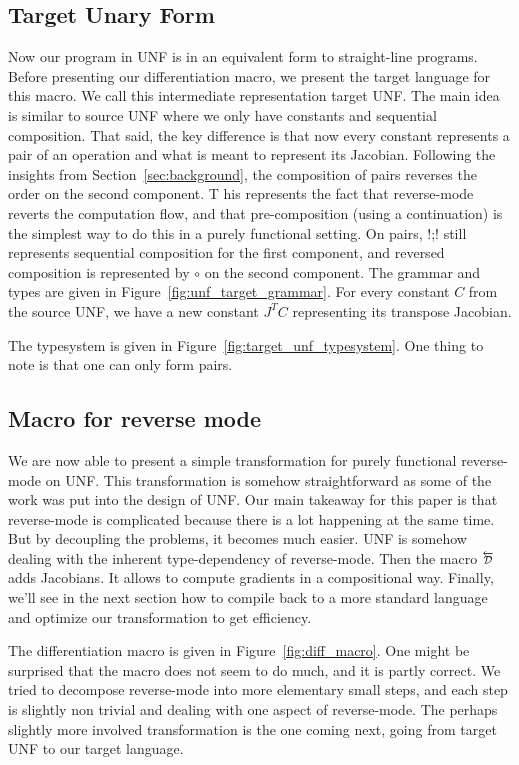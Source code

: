 

\subsection{Target Unary Form}

Now our program in UNF is in an equivalent form to straight-line programs. 
Before presenting our differentiation macro, we present the target language for this macro. 
We call this intermediate representation target UNF.
The main idea is similar to source UNF where we only have constants and sequential composition.
That said, the key difference is that now every constant represents a pair of an operation and what is meant to represent its Jacobian.
Following the insights from Section~\ref{sec:background}, the composition of pairs reverses the order on the second component. T
his represents the fact that reverse-mode reverts the computation flow, 
and that pre-composition (using a continuation) is the simplest way to do this in a purely functional setting.
On pairs, !;! still represents sequential composition for the first component, and reversed composition is represented by $\circ$ on the second component.
The grammar and types are given in Figure~\ref{fig:unf_target_grammar}.
For every constant $C$ from the source UNF, we have a new constant $J^TC$ representing its transpose Jacobian.



The typesystem is given in Figure~\ref{fig:target_unf_typesystem}. 
One thing to note is that one can only form pairs. 




\subsection{Macro for reverse mode}

We are now able to present a simple transformation for purely functional reverse-mode on UNF.
This transformation is somehow straightforward as some of the work was put into the design of UNF.
Our main takeaway for this paper is that reverse-mode is complicated because there is a lot happening at the same time. 
But by decoupling the problems, it becomes much easier. UNF is somehow dealing with the inherent type-dependency of reverse-mode.
Then the macro $\Dsynrevsymbol$ adds Jacobians. It allows to compute gradients in a compositional way.
Finally, we'll see in the next section how to compile back to a more standard language and optimize our transformation to get efficiency.

The differentiation macro is given in Figure~\ref{fig:diff_macro}.
One might be surprised that the macro does not seem to do much, and it is partly correct.
We tried to decompose reverse-mode into more elementary small steps, and each step is slightly non trivial and dealing with one aspect of reverse-mode.
The perhaps slightly more involved transformation is the one coming next,  going from target UNF to our target language.



